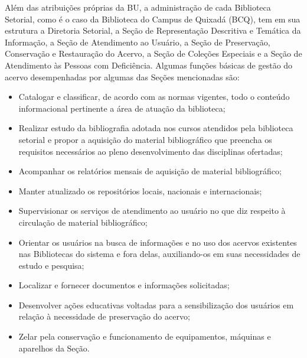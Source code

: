 Além das atribuições próprias da BU, a administração de cada Biblioteca Setorial, como é o caso da Biblioteca do Campus de Quixadá (BCQ), tem em sua estrutura a Diretoria Setorial, a Seção de Representação Descritiva e Temática da Informação, a Seção de Atendimento ao Usuário, a Seção de Preservação, Conservação e Restauração do Acervo, a Seção de Coleções Especiais e a Seção de Atendimento às Pessoas com Deficiência. Algumas funções básicas de gestão do acervo desempenhadas por algumas das Seções mencionadas são:
\begin{itemize}
    \item Catalogar e classificar, de acordo com as normas vigentes, todo o conteúdo informacional pertinente a área de atuação da biblioteca;
    \item Realizar estudo da bibliografia adotada nos cursos atendidos pela biblioteca setorial e propor a aquisição do material bibliográfico que preencha os requisitos necessários ao pleno desenvolvimento das disciplinas ofertadas;
    \item Acompanhar os relatórios mensais de aquisição de material bibliográfico;
    \item Manter atualizado os repositórios locais, nacionais e internacionais;
    \item Supervisionar os serviços de atendimento ao usuário no que diz respeito à circulação de material bibliográfico;
    \item Orientar os usuários na busca de informações e no uso dos acervos existentes nas Bibliotecas do sistema e fora delas, auxiliando-os em suas necessidades de estudo e pesquisa;
    \item Localizar e fornecer documentos e informações solicitadas;
    \item Desenvolver ações educativas voltadas para a sensibilização dos usuários em relação à necessidade de preservação do acervo;
    \item Zelar pela conservação e funcionamento de equipamentos, máquinas e aparelhos da Seção.
\end{itemize}


